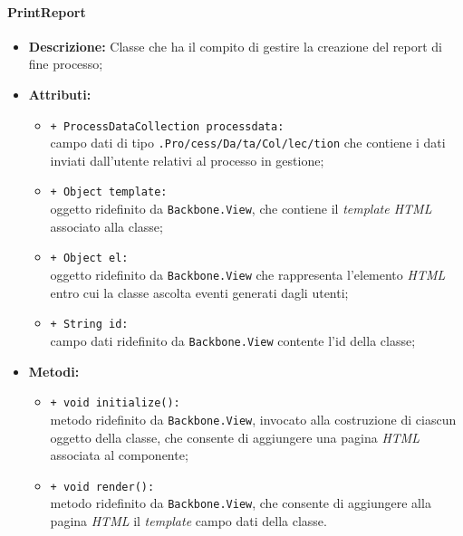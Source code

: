\paragraph{PrintReport}
\begin{flushleft}
\begin{itemize}
\item \textbf{Descrizione:} Classe che ha il compito di gestire la creazione del report di fine processo;
\item \textbf{Attributi:}
\begin{sloppypar}
\begin{itemize}
\item \texttt{+ ProcessDataCollection processdata:}\\ campo dati di tipo \texttt{\collection{}.Pro\fshyp{}cess\fshyp{}Da\fshyp{}ta\fshyp{}Col\fshyp{}lec\fshyp{}tion} che contiene i dati inviati dall'utente relativi al processo in gestione;
\item \texttt{+ Object template:}\\ oggetto ridefinito da \texttt{Backbone.View}, che contiene il \textit{template HTML} associato alla classe;
\item \texttt{+ Object el:}\\ oggetto ridefinito da \texttt{Backbone.View} che rappresenta l'elemento \textit{HTML} entro cui la classe ascolta eventi generati dagli utenti;
\item \texttt{+ String id:}\\ campo dati ridefinito da \texttt{Backbone.View} contente l'id della classe;
\end{itemize}
\end{sloppypar}
\item \textbf{Metodi:}
\begin{sloppypar}
\begin{itemize}
\item \texttt{+ void initialize():}\\ metodo ridefinito da \texttt{Backbone.View}, invocato alla costruzione di ciascun oggetto della classe, che consente di aggiungere una pagina \textit{HTML} associata al componente;
\item \texttt{+ void render():}\\ metodo ridefinito da \texttt{Backbone.View}, che consente di aggiungere alla pagina \textit{HTML} il \textit{template} campo dati della classe.
\end{itemize}
\end{sloppypar}
\end{itemize}
\end{flushleft}

